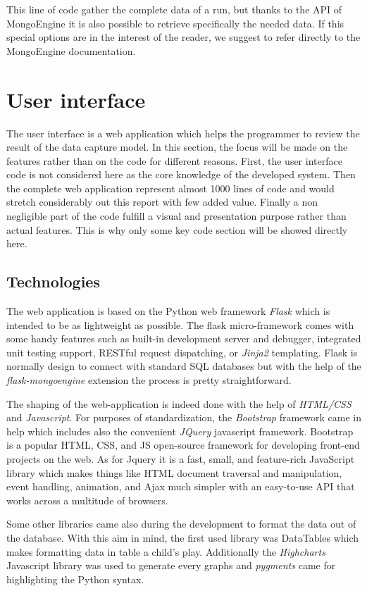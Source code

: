 This line of code gather the complete data of a run, but thanks to the API of MongoEngine it is also possible to retrieve specifically the needed data. If this special options are in the interest of the reader, we suggest to refer directly to the MongoEngine documentation.

\section{User interface}
The user interface is a web application which helps the programmer to review the result of the data capture model. In this section, the focus will be made on the features rather than on the code for different reasons. First, the user interface code is not considered here as the core knowledge of the developed system. Then the complete web application represent almost 1000 lines of code and would stretch considerably out this report with few added value. Finally a non negligible part of the code fulfill a visual and presentation purpose rather than actual features. This is why only some key code section will be showed directly here.

\subsection{Technologies}
The web application is based on the Python web framework \textit{Flask} which is intended to be as lightweight as possible. The flask micro-framework comes with some handy features such as built-in development server and debugger, integrated unit testing support, RESTful request dispatching, or \textit{Jinja2} templating. Flask is normally design to connect with standard SQL databases but with the help of the \textit{flask-mongoengine} extension the process is pretty straightforward.

The shaping of the web-application is indeed done with the help of \textit{HTML/CSS} and \textit{Javascript}. For purposes of standardization, the \textit{Bootstrap} framework came in help which includes also the convenient \textit{JQuery} javascript framework. Bootstrap is a popular HTML, CSS, and JS open-source framework for developing front-end projects on the web. As for Jquery it is a fast, small, and feature-rich JavaScript library which makes things like HTML document traversal and manipulation, event handling, animation, and Ajax much simpler with an easy-to-use API that works across a multitude of browsers.

Some other libraries came also during the development to format the data out of the database. With this aim in mind, the first used library was DataTables which makes formatting data in table a child's play. Additionally the \textit{Highcharts} Javascript library was used to generate every graphs and \textit{pygments} came for highlighting the Python syntax.

